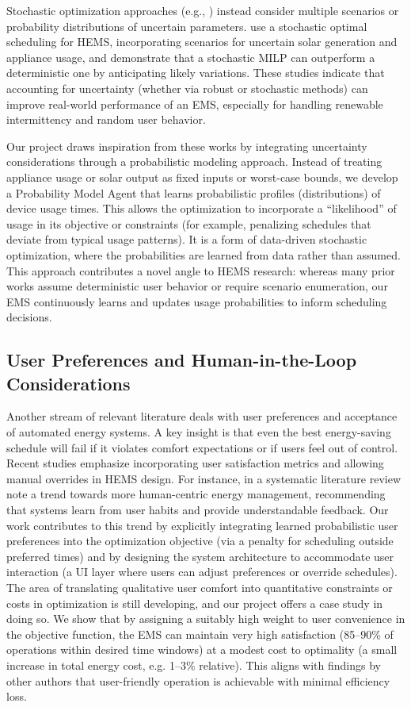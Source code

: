\documentclass[12pt,a4paper]{article}
\begin{document}
Stochastic optimization approaches (e.g., \cite{Yoshida2018}) instead consider multiple scenarios or probability distributions of uncertain parameters. \cite{Yoshida2018} use a stochastic optimal scheduling for HEMS, incorporating scenarios for uncertain solar generation and appliance usage, and demonstrate that a stochastic MILP can outperform a deterministic one by anticipating likely variations. These studies indicate that accounting for uncertainty (whether via robust or stochastic methods) can improve real-world performance of an EMS, especially for handling renewable intermittency and random user behavior.

Our project draws inspiration from these works by integrating uncertainty considerations through a probabilistic modeling approach. Instead of treating appliance usage or solar output as fixed inputs or worst-case bounds, we develop a Probability Model Agent that learns probabilistic profiles (distributions) of device usage times. This allows the optimization to incorporate a “likelihood” of usage in its objective or constraints (for example, penalizing schedules that deviate from typical usage patterns). It is a form of data-driven stochastic optimization, where the probabilities are learned from data rather than assumed. This approach contributes a novel angle to HEMS research: whereas many prior works assume deterministic user behavior or require scenario enumeration, our EMS continuously learns and updates usage probabilities to inform scheduling decisions.

\subsection{User Preferences and Human-in-the-Loop Considerations}
Another stream of relevant literature deals with user preferences and acceptance of automated energy systems. A key insight is that even the best energy-saving schedule will fail if it violates comfort expectations or if users feel out of control. Recent studies emphasize incorporating user satisfaction metrics and allowing manual overrides in HEMS design. For instance, \cite{Rehman2025} in a systematic literature review note a trend towards more human-centric energy management, recommending that systems learn from user habits and provide understandable feedback. Our work contributes to this trend by explicitly integrating learned probabilistic user preferences into the optimization objective (via a penalty for scheduling outside preferred times) and by designing the system architecture to accommodate user interaction (a UI layer where users can adjust preferences or override schedules). The area of translating qualitative user comfort into quantitative constraints or costs in optimization is still developing, and our project offers a case study in doing so. We show that by assigning a suitably high weight to user convenience in the objective function, the EMS can maintain very high satisfaction (85–90\% of operations within desired time windows) at a modest cost to optimality (a small increase in total energy cost, e.g. 1–3\% relative). This aligns with findings by other authors that user-friendly operation is achievable with minimal efficiency loss.
\end{document}
